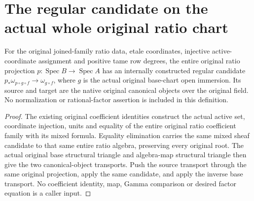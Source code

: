 \section{The regular candidate on the actual whole original ratio chart}

\begin{definition}
\label{def:kn-canonical-whole-ratio-native-sheaf-candidate}
\leanok
For the original joined-family ratio data, etale coordinates, injective
active-coordinate assignment and positive tame row degrees, the entire
original ratio projection $p:\operatorname{Spec}B\to\operatorname{Spec}A$
has an internally constructed regular candidate
$p_*\omega_{p\circ g\circ f}\to\omega_{g\circ f}$, where $g$ is the
actual original base-chart open immersion. Its source and target are the
native original canonical objects over the original field.
No normalization or rational-factor assertion is included in this definition.
\end{definition}
\begin{proof}
The existing original coefficient identities construct the actual active
set, coordinate injection, units and equality of the entire original ratio
coefficient family with its mixed formula. Equality elimination carries
the same mixed sheaf candidate to that same entire ratio algebra, preserving
every original root. The actual original base structural triangle and
algebra-map structural triangle then give the two canonical-object transports.
Push the source transport through the same original projection, apply the
same candidate, and apply the inverse base transport. No coefficient
identity, map, Gamma comparison or desired factor equation is a caller input.
\end{proof}
